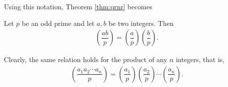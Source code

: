\documentclass[main.tex]{subfile}
\begin{document}
	Using this notation, Theorem \ref{thm:qrnr} becomes
	\begin{theorem}\label{thm:qrproduct}
		Let $p$ be an odd prime and let $a,b$ be two integers. Then
		\begin{align*}
			\left(\dfrac{ab}{p}\right) = \left(\dfrac{a}{p}\right) \left(\dfrac{b}{p}\right).
		\end{align*}
	\end{theorem}
	
	\begin{remark}
		Clearly, the same relation holds for the product of any $n$ integers, that is, 
		\begin{align*}
			\left(\dfrac{a_1a_2\cdots a_n}{p}\right) = \left(\dfrac{a_1}{p}\right) \left(\dfrac{a_2}{p}\right) \cdots \left(\dfrac{a_n}{p}\right).
		\end{align*}
	\end{remark}
	
\end{document}
